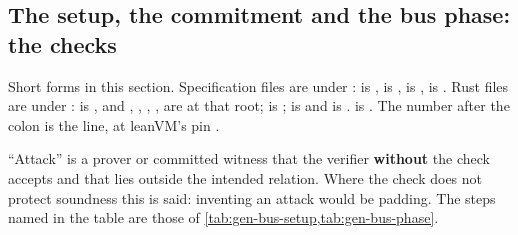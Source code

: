 \subsection{The setup, the commitment and the bus phase: the checks}\label{sec:gen-bus-checks}

\begin{sloppypar}
Short forms in this section. Specification files are under :
 is ,  is ,
 is ,  is .
Rust files are under :  is , and
, , , ,  are at that
root;  is ;  is 
and  is .  is .
The number after the colon is the line, at leanVM's pin .
\end{sloppypar}

``Attack'' is a prover or committed witness that the verifier \textbf{without} the check accepts
and that lies outside the intended relation. Where the check does not protect soundness this is
said: inventing an attack would be padding. The steps named in the table are those of
\cref{tab:gen-bus-setup,tab:gen-bus-phase}.

